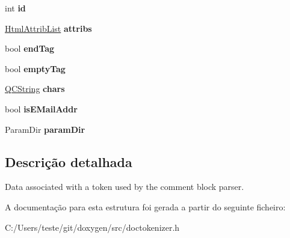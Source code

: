 \begin{DoxyCompactItemize}
\item 
\hypertarget{struct_token_info_a7441ef0865bcb3db9b8064dd7375c1ea}{int {\bfseries id}}\label{struct_token_info_a7441ef0865bcb3db9b8064dd7375c1ea}

\item 
\hypertarget{struct_token_info_a0dcdb73dcb282da0ba816dbbf9e76052}{\hyperlink{class_html_attrib_list}{Html\-Attrib\-List} {\bfseries attribs}}\label{struct_token_info_a0dcdb73dcb282da0ba816dbbf9e76052}

\item 
\hypertarget{struct_token_info_a458f48c8bc7022b3a122ccc914defbe7}{bool {\bfseries end\-Tag}}\label{struct_token_info_a458f48c8bc7022b3a122ccc914defbe7}

\item 
\hypertarget{struct_token_info_a65f11d33bf80a1d1a8046ee2edcf1055}{bool {\bfseries empty\-Tag}}\label{struct_token_info_a65f11d33bf80a1d1a8046ee2edcf1055}

\item 
\hypertarget{struct_token_info_a3aed708f1d2f2422f5a68e81c08174bf}{\hyperlink{class_q_c_string}{Q\-C\-String} {\bfseries chars}}\label{struct_token_info_a3aed708f1d2f2422f5a68e81c08174bf}

\item 
\hypertarget{struct_token_info_a570c72fcfaa2e85efd457524f6d4f0d1}{bool {\bfseries is\-E\-Mail\-Addr}}\label{struct_token_info_a570c72fcfaa2e85efd457524f6d4f0d1}

\item 
\hypertarget{struct_token_info_a45f4e992fcece4c5b8aa54ad9c555cb6}{Param\-Dir {\bfseries param\-Dir}}\label{struct_token_info_a45f4e992fcece4c5b8aa54ad9c555cb6}

\end{DoxyCompactItemize}


\subsection{Descrição detalhada}
Data associated with a token used by the comment block parser. 

A documentação para esta estrutura foi gerada a partir do seguinte ficheiro\-:\begin{DoxyCompactItemize}
\item 
C\-:/\-Users/teste/git/doxygen/src/doctokenizer.\-h\end{DoxyCompactItemize}
